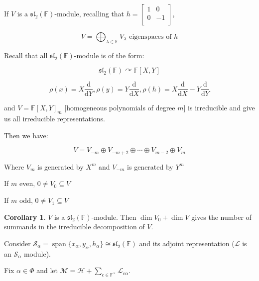 \documentclass{article}
\theoremstyle{definition}
\newtheorem{corollary}[theorem]{Corollary}
\renewcommand{\span}{\operatorname{span}}
\begin{document}
If \(V\) is a \(\mathfrak{sl}_2(\mathbb{F})\)-module, recalling that \(h = \begin{bmatrix}
    1 &  0 \\
    0 &  -1 \\
\end{bmatrix}\),

\[
    V = \bigoplus_{\lambda \in \mathbb{F}} V_\lambda \text{ eigenspaces of } h
\]

Recall that all \(\mathfrak{sl}_2(\mathbb{F})\)-module is of the form:

\[
    \mathfrak{sl}_2(\mathbb{F}) \curvearrowright \mathbb{F} [X,Y]
\]

\[
    \rho (x) = X \frac{\mathrm{d}}{\mathrm{d}Y}, \rho (y) = Y \frac{\mathrm{d}}{\mathrm{d}X} , \rho (h) = X \frac{\mathrm{d}}{\mathrm{d}X} - Y \frac{\mathrm{d}}{\mathrm{d}Y}  
\]

and \(V = \mathbb{F} [X,Y]_m\) [homogeneous polynomials of degree \(m\)] is irreducible and give us all irreducible representations. 

Then we have:

\[
    V = V_{-m} \oplus V_{-m + 2} \oplus \cdots \oplus V_{m-2} \oplus V_{m}
\]

Where \(V_m\) is generated by \(X^m\) and \(V_{-m}\) is generated by \(Y^m\) 

\begin{center}
\end{center}

If \(m\) even, \(0 \neq V_0 \subseteq V\)

If \(m\) odd, \(0 \neq V_1 \subseteq V\)

\begin{corollary}
    \(V\) is a \(\mathfrak{sl}_2(\mathbb{F})\)-module. Then \(\dim V_0 + \dim V\) gives the number of summands in the irreducible decomposition of \(V\).
\end{corollary}

Consider \(\mathcal{S}_\alpha = \span\{ x_\alpha , y_\alpha , h_\alpha  \} \cong \mathfrak{sl}_2(\mathbb{F})\) and its adjoint representation (\(\mathcal{L}\) is an \(\mathcal{S}_\alpha\) module).

Fix \(\alpha \in \Phi \) and let \(\mathcal{M} = \mathcal{H} + \sum_{c\in \mathbb{F} ^\times } \mathcal{L}_{c \alpha}\). 
\end{document}
